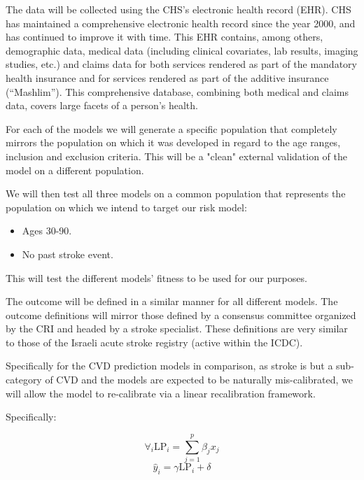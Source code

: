 \documentclass[a4paper,12pt]{article}
\begin{document}
\begin{description}
		The data will be collected using the CHS's electronic health record (EHR). CHS has maintained a comprehensive electronic health record since the year 2000, and has continued to improve it with time. This EHR contains, among others, demographic data, medical data (including clinical covariates, lab results, imaging studies, etc.) and claims data for both services rendered as part of the mandatory health insurance and for services rendered as part of the additive insurance (“Mashlim”). This comprehensive database, combining both medical and claims data, covers large facets of a person's health.
	
		For each of the models we will generate a specific population that completely mirrors the population on which it was developed in regard to the age ranges, inclusion and exclusion criteria. This will be a "clean" external validation of the model on a different population.
		
		We will then test all three models on a common population that represents the population on which we intend to target our risk model:
		
		\begin{itemize}
			\item Ages 30-90.
			\item No past stroke event.
		\end{itemize}
	
		This will test the different models' fitness to be used for our purposes.
		
		The outcome will be defined in a similar manner for all different models. The outcome definitions will mirror those defined by a consensus committee organized by the CRI and headed by a stroke specialist. These definitions are very similar to those of the Israeli acute stroke registry\cite{ICDC2017} (active within the ICDC).
		
		Specifically for the CVD prediction models in comparison, as stroke is but a sub-category of CVD and the models are expected to be naturally mis-calibrated, we will allow the model to re-calibrate via a linear recalibration framework\cite{Houwelingen2000}.
		
		Specifically:
		
		\begin{equation*}
		\forall_i \text{LP}_i = \sum_{j=1}^{p}\beta_jx_j
		\end{equation*}
		\begin{equation*}
		\hat{y}_i = \gamma \text{LP}_i + \delta
		\end{equation*}
		

\end{description}
\end{document}
